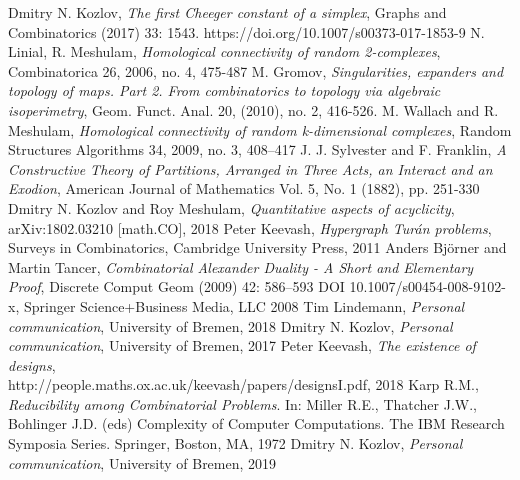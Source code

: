 \documentclass[11pt,english,onehalfspacing,headsepline]{MastersDoctoralThesis}
\begin{document}
\begin{thebibliography}{1}
Dmitry N. Kozlov, \textit{The first Cheeger constant of a simplex}, Graphs and Combinatorics (2017) 33: 1543. https://doi.org/10.1007/s00373-017-1853-9
N. Linial, R. Meshulam, \textit{Homological connectivity of random 2-complexes}, Combinatorica 26, 2006,
no. 4, 475-487
M. Gromov, \textit{Singularities, expanders and topology of maps. Part 2. From combinatorics to topology
via algebraic isoperimetry}, Geom. Funct. Anal. 20, (2010), no. 2, 416-526.
M. Wallach and R. Meshulam, \textit{Homological connectivity of random k-dimensional complexes}, Random Structures Algorithms 34, 2009, no. 3, 408–417
J. J. Sylvester and F. Franklin, \textit{A Constructive Theory of Partitions, Arranged in Three Acts, an Interact and an Exodion}, American Journal of Mathematics
Vol. 5, No. 1 (1882), pp. 251-330
 Dmitry N. Kozlov and Roy Meshulam, \textit{Quantitative aspects of acyclicity}, arXiv:1802.03210 [math.CO], 2018
 Peter Keevash, \textit{Hypergraph Tur\'{a}n problems}, Surveys in Combinatorics, Cambridge University Press, 2011
 Anders Björner and Martin Tancer, \textit{Combinatorial Alexander Duality - A Short and Elementary Proof}, Discrete Comput Geom (2009) 42: 586–593 DOI 10.1007/s00454-008-9102-x, Springer Science+Business Media, LLC 2008
 Tim Lindemann, \textit{Personal communication}, University of Bremen, 2018
 Dmitry N. Kozlov, \textit{Personal communication}, University of Bremen, 2017
 Peter Keevash, \textit{The existence of designs},\\ http://people.maths.ox.ac.uk/keevash/papers/designsI.pdf, 2018
 Karp R.M., \textit{Reducibility among Combinatorial Problems}. In: Miller R.E., Thatcher J.W., Bohlinger J.D. (eds) Complexity of Computer Computations. The IBM Research Symposia Series. Springer, Boston, MA, 1972
 Dmitry N. Kozlov, \textit{Personal communication}, University of Bremen, 2019
\end{thebibliography}

\printindex
\end{document}
